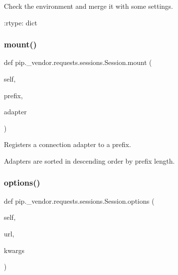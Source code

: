 \begin{DoxyVerb}Check the environment and merge it with some settings.

:rtype: dict
\end{DoxyVerb}
 \mbox{\label{classpip_1_1__vendor_1_1requests_1_1sessions_1_1Session_accd92e91eedda19ac042cde49548a489}} 
\subsubsection{\texorpdfstring{mount()}{mount()}}
{\footnotesize\ttfamily def pip.\+\_\+vendor.\+requests.\+sessions.\+Session.\+mount (\begin{DoxyParamCaption}\item[{}]{self,  }\item[{}]{prefix,  }\item[{}]{adapter }\end{DoxyParamCaption})}

\begin{DoxyVerb}Registers a connection adapter to a prefix.

Adapters are sorted in descending order by prefix length.
\end{DoxyVerb}
 \mbox{\label{classpip_1_1__vendor_1_1requests_1_1sessions_1_1Session_a5208dc1a384e941a4435dc8376432a2a}} 
\subsubsection{\texorpdfstring{options()}{options()}}
{\footnotesize\ttfamily def pip.\+\_\+vendor.\+requests.\+sessions.\+Session.\+options (\begin{DoxyParamCaption}\item[{}]{self,  }\item[{}]{url,  }\item[{}]{kwargs }\end{DoxyParamCaption})}

